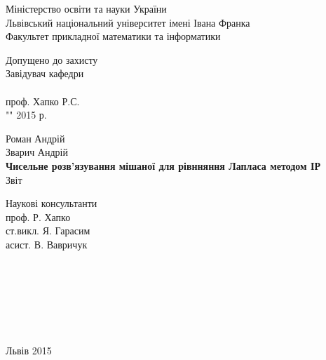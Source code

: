 \documentclass[a4 paper,12pt,ukrainian]{report}
\begin{document}
\titlepage
\begin{center}
\large {Міністерство освіти та науки України}\\
\large {Львівський національний університет імені Івана Франка}\\
\large {Факультет прикладної математики та інформатики}\\
\end{center}

\normalsize \vspace*{2cm}
\hspace*{11cm}Допущено до захисту\\
\hspace*{11cm}Завідувач кафедри\\
\hspace*{11cm}\underline{\hspace{3cm}}\\
\hspace*{11cm}проф. Хапко Р.С.\\
\hspace*{11cm}"\underline{\hspace{0.5cm}}"\underline{\hspace{2cm}} 2015 р.
\normalsize \vspace*{2cm}
\begin{center}
\large{Роман Андрій}\\
\large{Зварич Андрій}\\
\large{\textbf{Чисельне розв'язування мішаної для рівнняння Лапласа методом ІР}}\\
\large{Звіт}\\
\end{center}
\normalsize \vspace*{3cm}
\hspace*{11cm}Наукові консультанти\\
\hspace*{11cm}проф. Р. Хапко\\
\hspace*{11cm}ст.викл. Я. Гарасим\\
\hspace*{11cm}асист. В. Вавричук\\
\\
\\
\\
\\
\\
\\
\large\centerline{Львів 2015}
\tableofcontents
\end{document}
